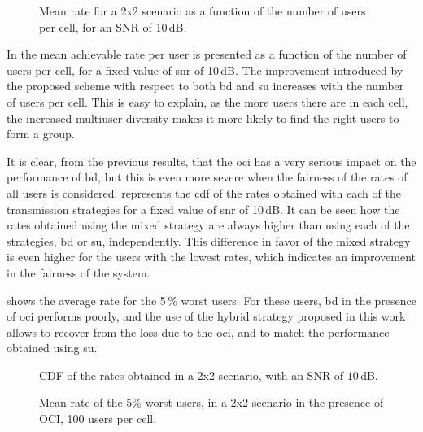 \begin{figure}[t]
    \centering
    \begin{minipage}[t]{0.7\textwidth}
        
    \end{minipage}
\caption{Mean rate for a 2x2 scenario as a function of the number of users per cell, for an SNR of 10\,dB.}
\label{fig:mean_rate_vs_users}
\end{figure}

In  the mean achievable rate per user is presented as a function of the number of users per cell, for a fixed value of \gls{snr} of
10\,dB. The improvement introduced by the proposed scheme with respect to both
\gls{bd} and \gls{su} increases with the number of users per cell. This is easy
to explain, as the more users there are in each cell, the increased multiuser 
diversity makes it more likely to find the right users to form a group.

It is clear, from the previous results, that the \gls{oci} has a very serious
impact on the performance of \gls{bd}, but this is even more severe when the
fairness of the rates of all users is considered. 
represents the \gls{cdf} of the rates obtained with each of the transmission
strategies for a fixed value of \gls{snr} of 10\,dB. It can be seen how the
rates obtained using the mixed strategy are always higher than using each of the
strategies, \gls{bd} or \gls{su}, independently. This difference in favor of the
mixed strategy is even higher for the users with the lowest rates, which
indicates an improvement in the fairness of the system.

 shows the average rate for the 5\,\% worst users. For
these users, \gls{bd} in the presence of \gls{oci} performs poorly, and the use
of the hybrid strategy proposed in this work allows to recover from the loss due
to the \gls{oci}, and to match the performance obtained using \gls{su}.

\begin{figure}[t]
    \centering
    \begin{minipage}[t]{0.7\textwidth}
        
    \end{minipage}
\caption{CDF of the rates obtained in a 2x2 scenario, with an SNR of $10$\,dB.}
\label{fig:cdf_snr10}
\end{figure}

\begin{figure}[t]
    \centering
    \begin{minipage}[t]{0.7\textwidth}
        
    \end{minipage}
\caption{Mean rate of the 5\% worst users, in a 2x2 scenario in the presence of OCI, 100 users per cell.}
\label{fig:worst_rate}
\end{figure}

